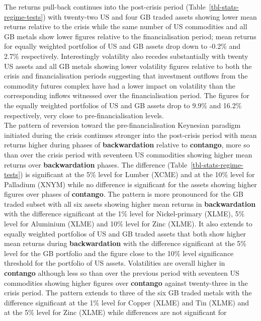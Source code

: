 \documentclass[
  authoryear,
  preprint,
  3p]{elsarticle}
\begin{document}
The returns pull-back continues into the post-crisis period
(Table~\ref{tbl-stats-regime-tests}) with twenty-two US and four GB
traded assets showing lower mean returns relative to the crisis while
the same number of US commodities and all GB metals show lower figures
relative to the financialisation period; mean returns for equally
weighted portfolios of US and GB assets drop down to -0.2\% and 2.7\%
respectively. Interestingly volatility also recedes substantially with
twenty US assets and all GB metals showing lower volatility figures
relative to both the crisis and financialisation periods suggesting that
investment outflows from the commodity futures complex have had a lower
impact on volatility than the corresponding inflows witnessed over the
financialisation period. The figures for the equally weighted portfolios
of US and GB assets drop to 9.9\% and 16.2\% respectively, very close to
pre-financialisation levels.\\
The pattern of reversion toward the pre-financialisation Keynesian
paradigm initiated during the crisis continues stronger into the
post-crisis period with mean returns higher during phases of
\textbf{backwardation} relative to \textbf{contango}, more so than over
the crisis period with seventeen US commodities showing higher mean
returns over \textbf{backwardation} phases. The difference
(Table~\ref{tbl-stats-regime-tests}) is significant at the 5\% level for
Lumber (XCME) and at the 10\% level for Palladium (XNYM) while no
difference is significant for the assets showing higher figures over
phases of \textbf{contango}. The pattern is more pronounced for the GB
traded subset with all six assets showing higher mean returns in
\textbf{backwardation} with the difference significant at the 1\% level
for Nickel-primary (XLME), 5\% level for Aluminium (XLME) and 10\% level
for Zinc (XLME). It also extends to equally weighted portfolios of US
and GB traded assets that both show higher mean returns during
\textbf{backwardation} with the difference significant at the 5\% level
for the GB portfolio and the figure close to the 10\% level significance
threshold for the portfolio of US assets. Volatilities are overall
higher in \textbf{contango} although less so than over the previous
period with seventeen US commodities showing higher figures over
\textbf{contango} against twenty-three in the crisis period. The pattern
extends to three of the six GB traded metals with the difference
significant at the 1\% level for Copper (XLME) and Tin (XLME) and at the
5\% level for Zinc (XLME) while differences are not significant for
\end{document}
